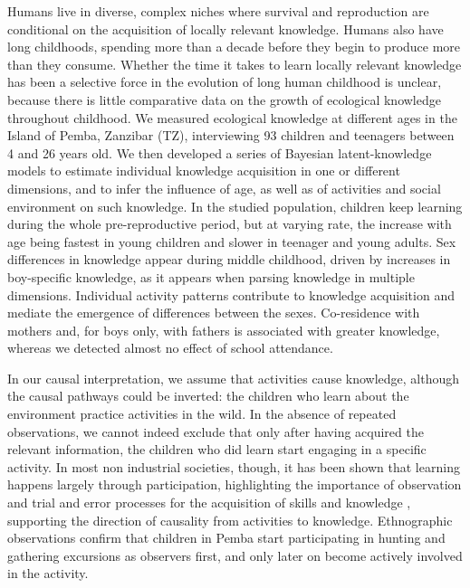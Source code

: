 Humans live in diverse, complex niches where survival and reproduction are conditional on the acquisition of locally relevant knowledge. Humans also have long childhoods, spending more than a decade before they begin to produce more than they consume. Whether the time it takes to learn locally relevant knowledge has been a selective force in the evolution of long human childhood is unclear, because there is little comparative data on the growth of ecological knowledge throughout childhood. 
    We measured ecological knowledge at different ages in the Island of Pemba, Zanzibar (TZ), interviewing 93 children and teenagers between 4 and 26 years old.
    We then developed a series of Bayesian latent-knowledge models to estimate individual knowledge acquisition in one or different dimensions, and to infer the influence of age, as well as of activities and social environment on such knowledge.
    In the studied population, children keep learning during the whole pre-reproductive period, but at varying rate, the increase with age being fastest in young children and slower in teenager and young adults. Sex differences in knowledge appear during middle childhood, driven by increases in boy-specific knowledge, as it appears when parsing knowledge in multiple dimensions. Individual activity patterns contribute to knowledge acquisition and mediate the emergence of differences between the sexes. Co-residence with mothers and, for boys only, with fathers is associated with greater knowledge, whereas we detected almost no effect of school attendance. 
    
In our causal interpretation, we assume that activities cause knowledge, although the causal pathways could be inverted: the children who learn about the environment practice activities in the wild. In the absence of repeated observations, we cannot indeed exclude that only after having acquired the relevant information, the children who did learn start engaging in a specific activity. In most non industrial societies, though, it has been shown that learning happens largely through participation, highlighting the importance of observation and trial and error processes for the acquisition of skills and knowledge , supporting the direction of causality from activities to knowledge. Ethnographic observations confirm that children in Pemba start participating in hunting and gathering excursions as observers first, and only later on become actively involved in the activity. 
